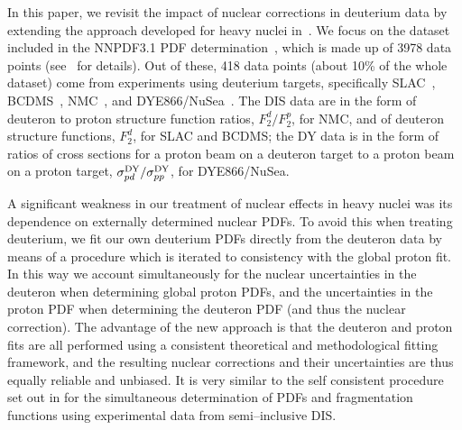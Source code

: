 \documentclass[11pt,a4paper]{article}
\begin{document}
In this paper, we revisit the impact of nuclear corrections in deuterium data
by extending the approach developed for heavy nuclei in~\cite{Ball:2018twp}.
We focus on the dataset included in the NNPDF3.1 PDF
determination~\cite{Ball:2018iqk}, which is made up of 3978 data points
(see~\cite{Ball:2017nwa} for details). Out of these, 418 data points (about
10\% of the whole dataset) come from experiments using deuterium targets,
specifically SLAC~\cite{Whitlow:1991uw}, BCDMS~\cite{Benvenuti:1989fm},
NMC~\cite{Arneodo:1996kd}, and DYE866/NuSea~\cite{Towell:2001nh}. The DIS data
are in the form of deuteron to proton structure function ratios, $F_2^d/F_2^p$,
for NMC, and of deuteron structure functions, $F_2^d$, for SLAC and BCDMS; the
DY data is in the form of ratios of cross sections for a proton beam on a
deuteron target to a proton beam on a proton target,
$\sigma^{\rm DY}_{pd}/\sigma^{\rm DY}_{pp}$, for DYE866/NuSea.

A significant weakness in our treatment of nuclear effects in heavy nuclei was
its dependence on externally determined nuclear PDFs. To avoid this when
treating deuterium, we fit our own deuterium PDFs directly from the deuteron
data by means of a procedure which is iterated to consistency with the global
proton fit. In this way we account simultaneously for the nuclear uncertainties
in the deuteron when determining global proton PDFs, and the uncertainties in
the proton PDF when determining the deuteron PDF (and thus the nuclear
correction). The advantage of the new approach is that the deuteron and proton
fits are all performed using a consistent theoretical and methodological
fitting framework, and the resulting nuclear corrections and their
uncertainties are thus equally reliable and unbiased. It is very similar to
the self consistent procedure set out in \cite{Ball:2018lag} for the
simultaneous determination of PDFs and fragmentation functions using
experimental data from semi--inclusive DIS. 
\end{document}
